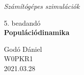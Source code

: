 \documentclass{article}[18pt]
\begin{document}
\begin{titlepage}
\begin{center}
\vspace*{1cm}
 
\Huge
\textit{Számítógépes szimulációk
}
 
\LARGE
\vspace{2cm}
5. beadandó\\
\textbf{Populációdinamika}
\vfill
    
 
\vspace{0.8cm}
Godó Dániel\\
W0PKR1\\
2021.03.28\\
 
\end{center}
\end{titlepage}
\newpage
 \tableofcontents
 \newpage
\end{document}

